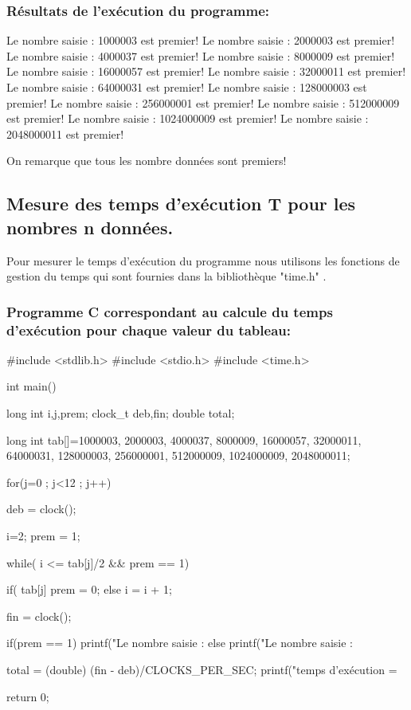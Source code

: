 \documentclass[12pt]{article}
\begin{document}
\subsubsection{Résultats de l'exécution du programme:}
\begin{sql}
Le nombre saisie : 1000003 est premier!
Le nombre saisie : 2000003 est premier!
Le nombre saisie : 4000037 est premier!
Le nombre saisie : 8000009 est premier!
Le nombre saisie : 16000057 est premier!
Le nombre saisie : 32000011 est premier!
Le nombre saisie : 64000031 est premier!
Le nombre saisie : 128000003 est premier!
Le nombre saisie : 256000001 est premier!
Le nombre saisie : 512000009 est premier!
Le nombre saisie : 1024000009 est premier!
Le nombre saisie : 2048000011 est premier!
\end{sql}

On remarque que tous les nombre données sont premiers!

\subsection{Mesure des temps d'exécution T pour les nombres n données.}

Pour mesurer le temps d'exécution du programme nous utilisons les fonctions de gestion du temps qui sont fournies dans la bibliothèque "time.h" .

\subsubsection{Programme C correspondant au calcule du temps d'exécution pour chaque valeur du tableau:}
\begin{sql}
#include <stdlib.h>
#include <stdio.h>
#include <time.h>

int main()
{
	long int i,j,prem;
	clock_t deb,fin;
	double total;

	long int tab[]={1000003, 2000003, 4000037, 8000009, 16000057, 32000011,	64000031, 128000003, 256000001,	512000009,	1024000009, 2048000011};

for(j=0 ; j<12 ; j++)
{
	deb = clock();
	
	i=2;
	prem = 1;

	while( i <= tab[j]/2 && prem == 1){

		if( tab[j]%
			prem = 0;
		else
			i = i + 1;
	}

	fin = clock();

	if(prem == 1)
    {
        printf("Le nombre saisie : %
    }
	else{
        printf("Le nombre saisie : %
	}

	total = (double) (fin - deb)/CLOCKS_PER_SEC;
	printf("temps d'exécution = %
}
return 0;
}
\end{sql}
\end{document}
